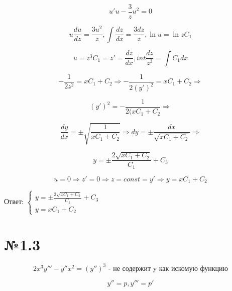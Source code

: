 \documentclass{article}
\begin{document}
\begin{equation*}
    u'u - \frac{3}{z}u^2 = 0
\end{equation*}

\begin{equation*}
    u\frac{du}{dz} = \frac{3u^2}{z}, \int{\frac{dz}{dx} = \frac{3dz}{z}}, \ln{u} = \ln{zC_1}
\end{equation*}

\begin{equation*}
    u = z^3C_1 = z' = \frac{dz}{dx}, int{\frac{dz}{z^3}} = \int{C_1dx}
\end{equation*}

\begin{equation*}
    -\frac{1}{2z^2} = xC_1 + C_2 \Rightarrow -\frac{1}{2(y')^2} = xC_1 + C_2 \Rightarrow
\end{equation*}

\begin{equation*}
    (y')^2 = - \frac{1}{2(xC_1 + C_2} \Rightarrow
\end{equation*}

\begin{equation*}
    \frac{dy}{dx} = \pm \sqrt{\frac{1}{xC_1 + C_2}} \Rightarrow dy = \pm \frac{dx}{\sqrt{xC_1 + C_2}} \Rightarrow
\end{equation*}

\begin{equation*}
    y = \pm \frac{2\sqrt{xC_1 + C_2}}{C_1} + C_3
\end{equation*}

\begin{equation*}
    u = 0 \Rightarrow z' = 0 \Rightarrow z = const = y' \Rightarrow y = xC_1 + C_2
\end{equation*}

Ответ: $
\begin{cases}
 y = \pm \frac{2\sqrt{xC_1 + C_2}}{C_1} + C_3 \\
 y = xC_1 + C_2
\end{cases}
$

\section*{№1.3}

\begin{equation*}
    2x^3y''' - y''x^2 = (y'')^3 \text{ - не содержит y как искомую функцию}
\end{equation*}

\begin{equation*}
    y'' = p, y''' = p'
\end{equation*}
\end{document}
